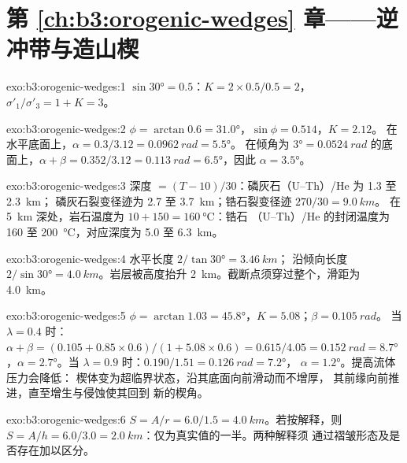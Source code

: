 \section*{第 \ref{ch:b3:orogenic-wedges} 章——逆冲带与造山楔}

\begin{solution}{exo:b3:orogenic-wedges:1}
$\sin\ang{30} = 0.5$：$K = 2\times0.5/0.5 = 2$，$\sigma'_1/\sigma'_3 = 1 +
K = 3$。
\end{solution}

\begin{solution}{exo:b3:orogenic-wedges:2}
$\phi = \arctan0.6 = \ang{31.0}$，$\sin\phi = 0.514$，$K = 2.12$。
在水平底面上，$\alpha = 0.3/3.12 = \qty{0.0962}{rad} = \ang{5.5}$。
在倾角为 $\ang{3} = \qty{0.0524}{rad}$ 的底面上，$\alpha + \beta = 0.352/3.12 =
\qty{0.113}{rad} = \ang{6.5}$，因此 $\alpha = \ang{3.5}$。
\end{solution}

\begin{solution}{exo:b3:orogenic-wedges:3}
深度 $= (T - 10)/30$：磷灰石（U--Th）/He 为 1.3 至 \qty{2.3}{km}；
磷灰石裂变径迹为 2.7 至 \qty{3.7}{km}；锆石裂变径迹 $270/30 = \qty{9.0}{km}$。
在 \qty{5}{km} 深处，岩石温度为 $10 + 150 = \qty{160}{\celsius}$：锆石
（U--Th）/He 的封闭温度为 160 至 \qty{200}{\celsius}，对应深度为 5.0 至
\qty{6.3}{km}。
\end{solution}

\begin{solution}{exo:b3:orogenic-wedges:4}
水平长度 $2/\tan\ang{30} = \qty{3.46}{km}$；
沿倾向长度 $2/\sin\ang{30} = \qty{4.0}{km}$。岩层被高度抬升
\qty{2}{km}。截断点须穿过整个，滑距为
\qty{4.0}{km}。
\end{solution}

\begin{solution}{exo:b3:orogenic-wedges:5}
$\phi = \arctan1.03 = \ang{45.8}$，$K = 5.08$；$\beta = \qty{0.105}{rad}$。
当 $\lambda = 0.4$ 时：$\alpha + \beta = (0.105 + 0.85\times0.6)/(1 +
5.08\times0.6) = 0.615/4.05 = \qty{0.152}{rad} = \ang{8.7}$，$\alpha =
\ang{2.7}$。当 $\lambda = 0.9$ 时：$0.190/1.51 = \qty{0.126}{rad} = \ang{7.2}$，
$\alpha = \ang{1.2}$。提高流体压力会降低：
楔体变为超临界状态，沿其底面向前滑动而不增厚，
其前缘向前推进，直至增生与侵蚀使其回到
新的楔角。
\end{solution}

\begin{solution}{exo:b3:orogenic-wedges:6}
$S = A/r = 6.0/1.5 = \qty{4.0}{km}$。若按解释，则 $S = A/h =
6.0/3.0 = \qty{2.0}{km}$：仅为真实值的一半。两种解释须
通过褶皱形态及是否存在加以区分。
\end{solution}

